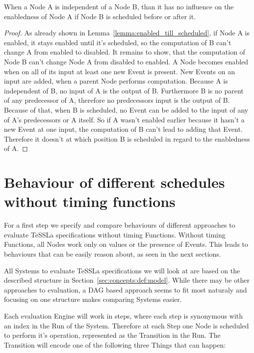 \begin{lemma}[name = Influence of independent Nodes]\label{lemma:independence}
  When a Node A is independent of a Node B, than it has no influence on the enabledness of Node A if Node B is scheduled before or after it.
\end{lemma}

\begin{proof}
  As already shown in Lemma~\ref{lemma:enabled_till_scheduled}, if Node A is enabled, it stays enabled until it's scheduled, so the computation of B can't change A from enabled to disabled.
  It remains to show, that the computation of Node B can't change Node A from disabled to enabled.
  A Node becomes enabled when on all of its input at least one new Event is present.
  New Events on an input are added, when a parent Node performs computation.
  Because A is independent of B, no input of A is the output of B.
  Furthermore B is no parent of any predecessor of A, therefore no predecessors input is the output of B.
  Because of that, when B is scheduled, no Event can be added to the input of any of A's predecessors or A itself.
  So if A wasn't enabled earlier because it hasn't a new Event at one input, the computation of B can't lead to adding that Event.
  Therefore it doesn't at which position B is scheduled in regard to the enabledness of A.
\end{proof}

\section{Behaviour of different schedules without timing functions}
\label{sec:concepts:behaviour_without_timing}

For a first step we specify and compare behaviours of different approaches to evaluate TeSSLa specifications without timing Functions.
Without timing Functions, all Nodes work only on values or the presence of Events.
This leads to behaviours that can be easily reason about, as seen in the next sections.

All Systems to evaluate TeSSLa specifications we will look at are based on the described structure in Section~\ref{sec:concepts:def:model}.
While there may be other approaches to evaluation, a DAG based approach seems to fit most naturaly and focusing on one structure makes comparing Systems easier.

Each evaluation Engine will work in steps, where each step is synonymous with an index in the Run of the System.
Therefore at each Step one Node is scheduled to perform it's operation, represented as the Transition in the Run.
The Transition will encode one of the following three Things that can happen:

